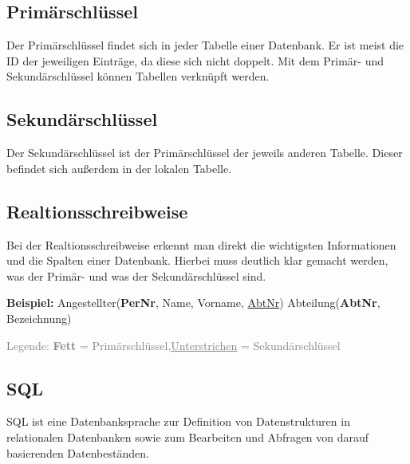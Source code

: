\documentclass[12pt,a4paper]{article}
\begin{document}
\subsection{Primärschlüssel}
    Der Primärschlüssel findet sich in jeder Tabelle einer Datenbank. Er ist meist die ID der jeweiligen Einträge, da diese sich nicht doppelt. Mit dem Primär- und Sekundärschlüssel können Tabellen verknüpft werden.
    
\subsection{Sekundärschlüssel}
    Der Sekundärschlüssel ist der Primärschlüssel der jeweils anderen Tabelle. Dieser befindet sich außerdem in der lokalen Tabelle.

\subsection{Realtionsschreibweise}
    Bei der Realtionsschreibweise erkennt man direkt die wichtigsten Informationen und die Spalten einer Datenbank. Hierbei muss deutlich klar gemacht werden, was der Primär- und was der Sekundärschlüssel sind.\vspace{.2cm}\newline
    \begin{minipage}[t]{.5\textwidth}
        \textbf{Beispiel:}\newline
        Angestellter(\textbf{PerNr}, Name, Vorname, \underline{AbtNr})\newline
        Abteilung(\textbf{AbtNr}, Bezeichnung)
    \end{minipage} 
    \hspace{1cm}
    \begin{minipage}[t]{.4\textwidth}
        \textcolor{gray}{
        Legende:\newline
        \textbf{Fett} = Primärschlüssel,\newline \underline{Unterstrichen} = Sekundärschlüssel}
    \end{minipage}   
  
\subsection{SQL}
    SQL ist eine Datenbanksprache zur Definition von Datenstrukturen in relationalen Datenbanken sowie zum Bearbeiten und Abfragen von darauf basierenden Datenbeständen.
\end{document}
